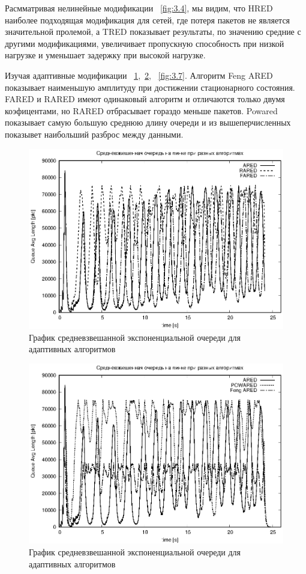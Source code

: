 Расмматривая нелинейные модификации ~\ref{fig:3.4}, мы видим, что HRED наиболее подходящая модификация для сетей, где потеря пакетов не является значительной пролемой, а TRED показывает результаты, по значению средние с другими модификациями, увеличивает пропускную способность при
низкой нагрузке и уменьшает задержку при высокой нагрузке.  

Изучая адаптивные модификации ~\ref{fig:3.5},~\ref{fig:3.6}, ~\ref{fig:3.7}. Алгоритм Feng ARED показывает наименьшую амплитуду при достижении стационарного состояния. FARED и RARED имеют одинаковый алгоритм и отличаются только двумя коэфицентами, но RARED отбрасывает гораздо меньше пакетов. Powared показывает самую большую среднюю длину очереди и из вышеперчисленных показывет наибольший разброс между данными.


\begin{figure}[!ht]
  \centering
  \includegraphics[width=0.7\linewidth]{image/av_queues_adaptive1.eps}
  \caption{График средневзвешанной экспоненциальной очереди для адаптивных алгоритмов}
  \label{fig:3.5}
\end{figure}

\begin{figure}[!ht]
  \centering
  \includegraphics[width=0.7\linewidth]{image/av_queues_adaptive2.eps}
  \caption{График средневзвешанной экспоненциальной очереди для адаптивных алгоритмов}
  \label{fig:3.6}
\end{figure}

